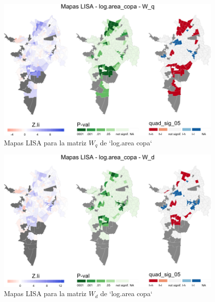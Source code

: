 \documentclass[12pt,a4paper,openany]{book}
\theoremstyle{definition}
\theoremstyle{definition}
\theoremstyle{definition}
\theoremstyle{remark}
\begin{document}
\begin{figure}

{\centering \includegraphics[width=1\linewidth]{tesis-unigis_files/figure-latex/mapas-lisa-copa-wq-1} 

}

\caption{Mapas LISA para la matriz $W_q$ de `log.area copa`}\label{fig:mapas-lisa-copa-wq}
\end{figure}

\begin{figure}

{\centering \includegraphics[width=1\linewidth]{tesis-unigis_files/figure-latex/mapas-lisa-copa-wd-1} 

}

\caption{Mapas LISA para la matriz $W_d$ de `log.area copa`}\label{fig:mapas-lisa-copa-wd}
\end{figure}
\end{document}
